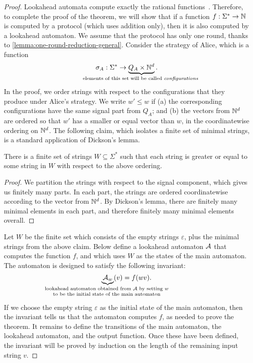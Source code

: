 \begin{proof}
Lookahead automata compute exactly the rational functions~\cite[Theorem 14.1]{bojanczyk_automata_2025}. Therefore, to complete the proof of the theorem, we will show that if a function $f : \Sigma^* \to {\mathbb N}$ is computed by a protocol (which uses addition only), then it is also computed by a lookahead automaton.
We assume that the protocol has only one round, thanks to \cref{lemma:one-round-reduction-general}. Consider the strategy of Alice, which is a function 
\begin{align*}
\sigma_A : \Sigma^* \to \myunderbrace{Q_A \times \Nat^d}{elements of this set will be called \emph{configurations}}.
\end{align*}
In the proof, we order strings with respect to the configurations that they produce under Alice's strategy. We write $w' \le w$ if (a) the corresponding configurations have the same signal part from $Q_A$; and (b) the vectors from ${\mathbb N}^d$ are ordered so that  $w'$ has a smaller or equal vector than $w$, in the coordinatewise ordering on ${\mathbb N}^d$. The following claim, which isolates a finite set of minimal strings, is a standard application of Dickson's lemma.

\begin{claim}\label{claim:minimal-configurations}
  There is a finite set of strings $W \subseteq \Sigma^*$ such that each string is greater or equal to some string in $W$ with respect to the above ordering.
\end{claim}
\begin{proof}
  We partition the strings with respect to the signal component, which gives us finitely many parts. In each part, the strings are ordered coordinatewise according to the vector from ${\mathbb N}^d$. By Dickson's lemma, there are finitely many minimal elements in each part, and therefore finitely many minimal elements overall.
\end{proof}

Let $W$ be the finite set which consists of the empty strings $\varepsilon$, plus the minimal strings from the above claim. Below define a lookahead automaton ${\mathcal A}$ that computes the function $f$, and which uses $W$ as the states of the main automaton. The automaton is designed to satisfy the following invariant:
\begin{align*}
\myunderbrace{\Aa_w}{lookahead automaton obtained from $\Aa$ by setting $w$ \\ to be the initial state of the main automaton}(v){} = f(wv).
\end{align*}
If we choose the empty string $\varepsilon$ as the initial state of the main automaton, then the invariant tells us that the automaton computes $f$, as needed to prove the theorem. It remains to define the transitions of the main automaton, the lookahead automaton, and the output function. Once these have been defined, the invariant will be proved by induction on the length of the remaining input string $v$.


\end{proof}
